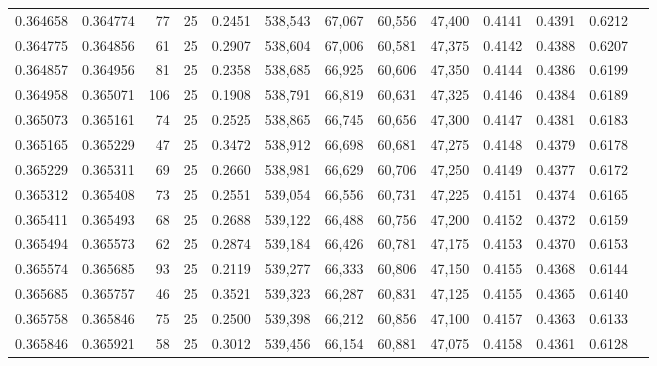 \begin{tabular}{rrrrrrrrrrrrr}
0.364658 & 0.364774 &    77 &  25 &                                     0.2451 & 538,543 &  67,067 &  60,556 &  47,400 & 0.4141 & 0.4391 & 0.6212 \\
0.364775 & 0.364856 &    61 &  25 &                                     0.2907 & 538,604 &  67,006 &  60,581 &  47,375 & 0.4142 & 0.4388 & 0.6207 \\
0.364857 & 0.364956 &    81 &  25 &                                     0.2358 & 538,685 &  66,925 &  60,606 &  47,350 & 0.4144 & 0.4386 & 0.6199 \\
0.364958 & 0.365071 &   106 &  25 &                                     0.1908 & 538,791 &  66,819 &  60,631 &  47,325 & 0.4146 & 0.4384 & 0.6189 \\
0.365073 & 0.365161 &    74 &  25 &                                     0.2525 & 538,865 &  66,745 &  60,656 &  47,300 & 0.4147 & 0.4381 & 0.6183 \\
0.365165 & 0.365229 &    47 &  25 &                                     0.3472 & 538,912 &  66,698 &  60,681 &  47,275 & 0.4148 & 0.4379 & 0.6178 \\
0.365229 & 0.365311 &    69 &  25 &                                     0.2660 & 538,981 &  66,629 &  60,706 &  47,250 & 0.4149 & 0.4377 & 0.6172 \\
0.365312 & 0.365408 &    73 &  25 &                                     0.2551 & 539,054 &  66,556 &  60,731 &  47,225 & 0.4151 & 0.4374 & 0.6165 \\
0.365411 & 0.365493 &    68 &  25 &                                     0.2688 & 539,122 &  66,488 &  60,756 &  47,200 & 0.4152 & 0.4372 & 0.6159 \\
0.365494 & 0.365573 &    62 &  25 &                                     0.2874 & 539,184 &  66,426 &  60,781 &  47,175 & 0.4153 & 0.4370 & 0.6153 \\
0.365574 & 0.365685 &    93 &  25 &                                     0.2119 & 539,277 &  66,333 &  60,806 &  47,150 & 0.4155 & 0.4368 & 0.6144 \\
0.365685 & 0.365757 &    46 &  25 &                                     0.3521 & 539,323 &  66,287 &  60,831 &  47,125 & 0.4155 & 0.4365 & 0.6140 \\
0.365758 & 0.365846 &    75 &  25 &                                     0.2500 & 539,398 &  66,212 &  60,856 &  47,100 & 0.4157 & 0.4363 & 0.6133 \\
0.365846 & 0.365921 &    58 &  25 &                                     0.3012 & 539,456 &  66,154 &  60,881 &  47,075 & 0.4158 & 0.4361 & 0.6128 \\

\end{tabular}

